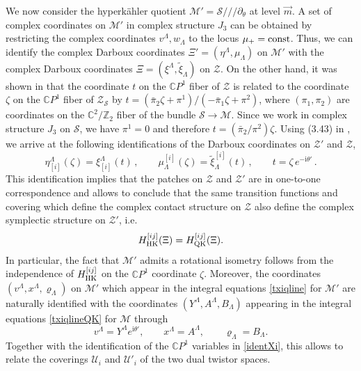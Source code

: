 \documentclass[12pt,reqno]{article}
\numberwithin{equation}{section}
\newcommand{\be}{\begin{equation}}
\newcommand{\ee}{\end{equation}}
\def\vrh{\varrho}
\newcommand{\CP}{\IC P^1}
\newcommand{\I}{\mathrm{i}}
\def\vrh{\varrho}
\newcommand{\cS}{\mathcal{S}}
\newcommand{\cM}{\mathcal{M}}
\newcommand{\cU}{\mathcal{U}}
\newcommand{\cZ}{\mathcal{Z}}
\newcommand{\IC}{\mathbb{C}}
\newcommand{\IZ}{\mathbb{Z}}
\def\hHij#1{H^{[#1]}_{\rm HK}}
\def\qHij#1{H^{[#1]}_{\rm QK}}
\def\etai#1{\eta_{[#1]}}
\def\xii#1{\xi_{[#1]}}
\def\mui#1{\mu^{[#1]}}
\def\txii#1{{\tilde\xi}^{[#1]}}
\def\pa{\partial}
\newcommand{\txi}{\tilde\xi}
\newcommand{\hk}{{hyperk\"ahler}\xspace}
\def\varpiqk{t}
\def\varpihk{\zeta}
\def\sigp{{\theta}}
\def\phip{{\theta'}}
\def\pcM{\cM'}
\def\pcZ{\cZ'}
\numberwithin{equation}{section}
\begin{document}
We now consider the \hk quotient $\pcM=\cS///\pa_\sigp$ at level $\vec m$.
A set of complex coordinates on $\pcM$ in complex structure $J_3$ can be obtained by restricting the
complex coordinates $v^\Lambda,w_\Lambda$ to the locus $\mu_+={\rm const}$.
Thus, we can identify the complex Darboux coordinates $\Xi'=(\eta^\Lambda,\mu_\Lambda)$
on $\pcM$ with the complex Darboux coordinates  $\Xi=(\xi^\Lambda,\txi_\Lambda)$ on $\cZ$.
On the other hand, it was shown in \cite{Alexandrov:2008nk} that the coordinate $\varpiqk$
on the $\CP$ fiber of $\cZ$  is related to the coordinate $\varpihk$
on the $\CP$ fiber of $\cZ_\cS$ by $\varpiqk=(\bar\pi_2\varpihk+\pi^1)/(-\bar\pi_1\varpihk+\pi^2)$,
where $(\pi_1,\pi_2)$ are coordinates on the $\IC^2/\IZ_2$ fiber of the bundle $\cS\rightarrow \cM$. Since we
work in complex structure $J_3$ on $\cS$, we have $\pi^1=0$ and therefore
$\varpiqk=(\bar\pi_2/\pi^2) \varpihk$. Using (3.43) in  \cite{Alexandrov:2008nk},
we arrive at the following identifications of the Darboux coordinates on $\pcZ$ and $\cZ$,
\be
\label{identXi}
\etai{i}^\Lambda(\varpihk)=\xii{i}^\Lambda(\varpiqk)\, ,
\qquad
\mui{i}_\Lambda(\varpihk )= \txii{i}_\Lambda(\varpiqk)\, ,
\qquad
\varpiqk=\varpihk\, e^{-\I\phip}\, .
\ee
This identification implies that the patches on $\cZ$ and $\pcZ$ are in one-to-one correspondence
and allows to conclude that the same transition functions and covering which
define the complex contact structure
on $\cZ$ also define the complex symplectic structure
on $\pcZ$, i.e.
\be
\hHij{ij}(\Xi)=\qHij{ij}(\Xi).
\label{relHKQK}
\ee
In particular, the fact that
$\pcM$ admits  a rotational isometry follows from the
independence of $\hHij{ij}$ on the $\CP$ coordinate $\varpihk$.
Moreover, the coordinates $(v^\Lambda,x^\Lambda,\vrh_\Lambda)$ on $\pcM$
which appear in the integral equations \eqref{txiqline} for $\pcM$ are naturally
identified with the coordinates $(Y^\Lambda, A^\Lambda,B_\Lambda)$ appearing
in the integral equations \eqref{txiqlineQK} for $\cM$ through
\be
v^\Lambda=Y^\Lambda e^{\I\phip},
\qquad
x^\Lambda=A^\Lambda,
\qquad
\vrh_\Lambda=B_\Lambda.
\label{identrealcoor}
\ee
Together with the identification of the $\CP$ variables in \eqref{identXi}, this allows
to relate the coverings $\cU_i$ and $\cU'_i$ of the two dual twistor spaces.
\end{document}

